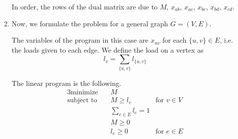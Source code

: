 \documentclass[letterpaper,11pt]{article}
\begin{document}
\begin{enumerate}
\begin{enumerate}
                In order, the rows of the dual matrix are due to $M$, $x_{ab}$,
                $x_{ac}$, $x_{bc}$, $x_{bd}$, $x_{cd}$.

            \item Now, we formulate the problem for a general graph
                $G = (V, E)$.

                The variables of the program in this case are $x_{uv}$
                for each $\{u, v\} \in E$, i.e. the loads given to each edge.
                We define the load on a vertex as
                $$
                l_v = \sum_{\{u, v\}} {l_{\{u, v\}}}
                $$

                The linear program is the following.
                \begin{alignat*}{3}
                    \text{minimize} \quad
                        & M \\
                    \text{subject to} \quad
                        & M \geq l_v & \text{for } v \in V \\
                        & \sum_{e \in E} l_e = 1 \\
                        & M \geq 0 \\
                        & l_e \geq 0 & \text{for } e \in E
                \end{alignat*}
        \end{enumerate}

\end{enumerate}
\end{document}
